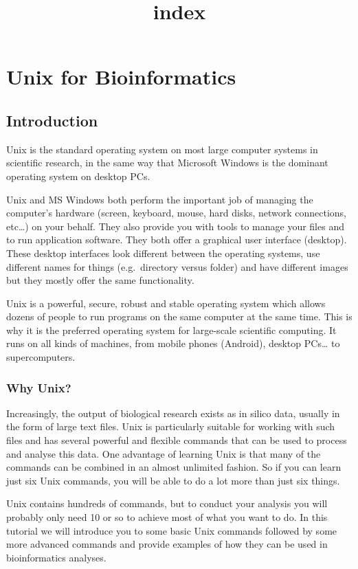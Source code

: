 \documentclass[11pt]{article}
\title{index}
\begin{document}
    \hypertarget{unix-for-bioinformatics}{%
\section{Unix for Bioinformatics}\label{unix-for-bioinformatics}}

\hypertarget{introduction}{%
\subsection{Introduction}\label{introduction}}

Unix is the standard operating system on most large computer systems in
scientific research, in the same way that Microsoft Windows is the
dominant operating system on desktop PCs.

Unix and MS Windows both perform the important job of managing the
computer's hardware (screen, keyboard, mouse, hard disks, network
connections, etc\ldots{}) on your behalf. They also provide you with
tools to manage your files and to run application software. They both
offer a graphical user interface (desktop). These desktop interfaces
look different between the operating systems, use different names for
things (e.g.~directory versus folder) and have different images but they
mostly offer the same functionality.

Unix is a powerful, secure, robust and stable operating system which
allows dozens of people to run programs on the same computer at the same
time. This is why it is the preferred operating system for large-scale
scientific computing. It runs on all kinds of machines, from mobile
phones (Android), desktop PCs\ldots{} to supercomputers.

\hypertarget{why-unix}{%
\subsubsection{Why Unix?}\label{why-unix}}

Increasingly, the output of biological research exists as in silico
data, usually in the form of large text files. Unix is particularly
suitable for working with such files and has several powerful and
flexible commands that can be used to process and analyse this data. One
advantage of learning Unix is that many of the commands can be combined
in an almost unlimited fashion. So if you can learn just six Unix
commands, you will be able to do a lot more than just six things.

Unix contains hundreds of commands, but to conduct your analysis you
will probably only need 10 or so to achieve most of what you want to do.
In this tutorial we will introduce you to some basic Unix commands
followed by some more advanced commands and provide examples of how they
can be used in bioinformatics analyses.
\end{document}
